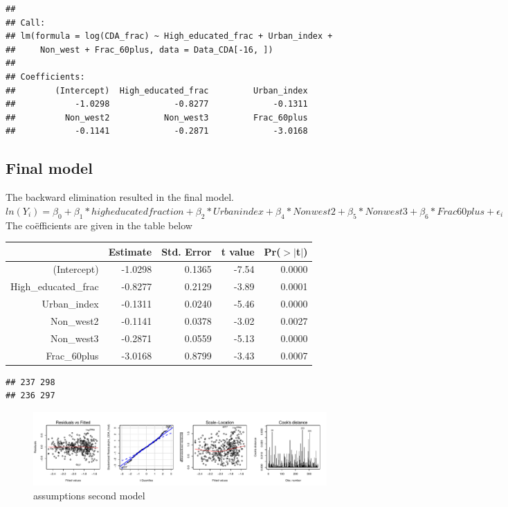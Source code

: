 \documentclass[11pt,]{article}
\begin{document}
\begin{verbatim}
## 
## Call:
## lm(formula = log(CDA_frac) ~ High_educated_frac + Urban_index + 
##     Non_west + Frac_60plus, data = Data_CDA[-16, ])
## 
## Coefficients:
##        (Intercept)  High_educated_frac         Urban_index  
##            -1.0298             -0.8277             -0.1311  
##          Non_west2           Non_west3         Frac_60plus  
##            -0.1141             -0.2871             -3.0168
\end{verbatim}

\subsection{Final model}\label{final-model}

The backward elimination resulted in the final model.\\
\(ln(Y_i) = \beta_0 + \beta_1*high educated fraction + \beta_2*Urban index + \beta_4*Non west2 + \beta_5*Non west 3 + \beta_6*Frac 60plus + \epsilon_i\)
The coëfficients are given in the table below

\begin{table}[ht]
\centering
\begin{tabular}{rrrrr}
  \hline
 & Estimate & Std. Error & t value & Pr($>$$|$t$|$) \\ 
  \hline
(Intercept) & -1.0298 & 0.1365 & -7.54 & 0.0000 \\ 
  High\_educated\_frac & -0.8277 & 0.2129 & -3.89 & 0.0001 \\ 
  Urban\_index & -0.1311 & 0.0240 & -5.46 & 0.0000 \\ 
  Non\_west2 & -0.1141 & 0.0378 & -3.02 & 0.0027 \\ 
  Non\_west3 & -0.2871 & 0.0559 & -5.13 & 0.0000 \\ 
  Frac\_60plus & -3.0168 & 0.8799 & -3.43 & 0.0007 \\ 
   \hline
\end{tabular}
\end{table}

\begin{verbatim}
## 237 298 
## 236 297
\end{verbatim}

\begin{figure}[H]

{\centering \includegraphics{Report_files/figure-latex/unnamed-chunk-13-1} 

}

\caption{\label{asm}assumptions second model}\label{fig:unnamed-chunk-13}
\end{figure}
\end{document}
